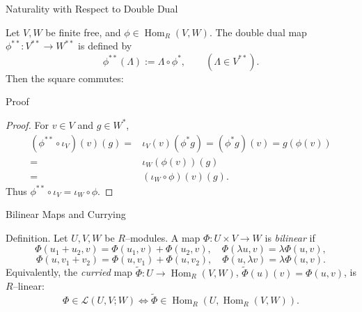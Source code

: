 \begin{frame}{Naturality with Respect to Double Dual}
\vspace{-0.5cm}
\begin{block}{}
Let $V,W$ be finite free, and $\phi\in\operatorname{Hom}_R(V,W)$. The double dual map $\phi^{**}:V^{**}\to W^{**}$ is defined by
\[
\phi^{**}(\Lambda):= \Lambda\circ \phi^*,\qquad (\Lambda\in V^{**}).
\]
Then the square commutes:
\vspace{-0.7cm}
\begin{center}
\end{center}

\end{block}
\end{frame}

\begin{frame}{Proof}

\begin{proof}
For $v\in V$ and $g\in W^*$,
\begin{align*}
\left(\phi^{**}\circ \iota_V\right)(v)(g)=& \iota_V(v)(\phi^* g) = (\phi^* g)(v)=g(\phi(v))\\
=& \iota_W(\phi(v))(g)\\
=& \left(\iota_W\circ \phi\right)(v)(g).
\end{align*}
Thus $\phi^{**}\circ \iota_V=\iota_W\circ \phi$.
\end{proof}

\end{frame}

\begin{frame}{Bilinear Maps and Currying}
\begin{block}{Definition.} Let $U,V,W$ be $R$–modules. A map $\Phi:U\times V\to W$ is \emph{bilinear} if
\[
\Phi(u_1+u_2,v)=\Phi(u_1,v)+\Phi(u_2,v),\quad
\Phi(\lambda u,v)=\lambda \Phi(u,v),
\]
\[
\Phi(u,v_1+v_2)=\Phi(u,v_1)+\Phi(u,v_2),\quad
\Phi(u,\lambda v)=\lambda \Phi(u,v).
\]
Equivalently, the \emph{curried} map $\widetilde{\Phi}:U\to \operatorname{Hom}_R(V,W)$, $\widetilde{\Phi}(u)(v)=\Phi(u,v)$, is $R$–linear:
\[
\Phi\in \mathcal{L}(U,V;W) \iff \widetilde{\Phi}\in \operatorname{Hom}_R\left(U,\operatorname{Hom}_R(V,W)\right).
\]

\end{block}

\end{frame}

